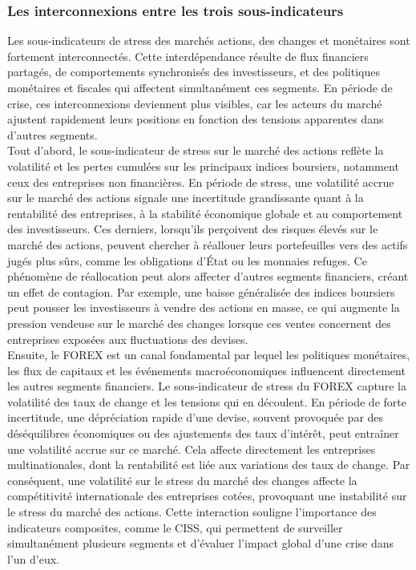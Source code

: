 \begin{sloppypar}
\subsubsection{Les interconnexions entre les trois sous-indicateurs}

Les sous-indicateurs de stress des marchés actions, des changes et monétaires sont fortement interconnectés. Cette interdépendance résulte de flux financiers partagés, de comportements synchronisés des investisseurs, et des politiques monétaires et fiscales qui affectent simultanément ces segments. En période de crise, ces interconnexions deviennent plus visibles, car les acteurs du marché ajustent rapidement leurs positions en fonction des tensions apparentes dans d'autres segments.\\

Tout d'abord, le sous-indicateur de stress sur le marché des actions reflète la volatilité et les pertes cumulées sur les principaux indices boursiers, notamment ceux des entreprises non financières. En période de stress, une volatilité accrue sur le marché des actions signale une incertitude grandissante quant à la rentabilité des entreprises, à la stabilité économique globale et au comportement des investisseurs. Ces derniers, lorsqu'ils perçoivent des risques élevés sur le marché des actions, peuvent chercher à réallouer leurs portefeuilles vers des actifs jugés plus sûrs, comme les obligations d'État ou les monnaies refuges. Ce phénomène de réallocation peut alors affecter d’autres segments financiers, créant un effet de contagion. Par exemple, une baisse généralisée des indices boursiers peut pousser les investisseurs à vendre des actions en masse, ce qui augmente la pression vendeuse sur le marché des changes lorsque ces ventes concernent des entreprises exposées aux fluctuations des devises.\\

Ensuite, le FOREX est un canal fondamental par lequel les politiques monétaires, les flux de capitaux et les événements macroéconomiques influencent directement les autres segments financiers. Le sous-indicateur de stress du FOREX capture la volatilité des taux de change et les tensions qui en découlent. En période de forte incertitude, une dépréciation rapide d'une devise, souvent provoquée par des déséquilibres économiques ou des ajustements des taux d’intérêt, peut entraîner une volatilité accrue sur ce marché. Cela affecte directement les entreprises multinationales, dont la rentabilité est liée aux variations des taux de change. Par conséquent, une volatilité sur le stress du marché des changes affecte la compétitivité internationale des entreprises cotées, provoquant une instabilité sur le stress du marché des actions. Cette interaction souligne l'importance des indicateurs composites, comme le CISS, qui permettent de surveiller simultanément plusieurs segments et d'évaluer l'impact global d'une crise dans l'un d'eux.\\


\end{sloppypar}
